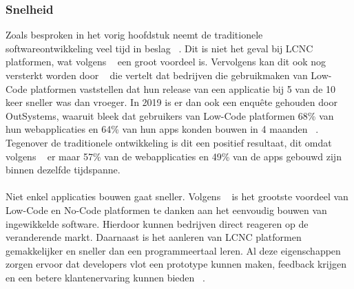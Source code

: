 \subsubsection{Snelheid}
\label{subsec:snelheid}
Zoals besproken in het vorig hoofdstuk neemt de traditionele softwareontwikkeling veel tijd in beslag ~\autocite{Moskal_2021}. 
Dit is niet het geval bij LCNC platformen, wat volgens ~\textcite{Adrian_2020} een groot voordeel is. 
Vervolgens kan dit ook nog versterkt worden door ~\textcite{Yan2021} die vertelt dat bedrijven die gebruikmaken van 
Low-Code platformen vaststellen dat hun release van een applicatie bij 5 van de 10 keer sneller was dan vroeger. In 2019 is er dan ook een enquête gehouden door OutSystems, 
waaruit bleek dat gebruikers van Low-Code platformen 68\% van hun webapplicaties en 64\% van hun apps konden bouwen in 4 maanden ~\autocite{Yan2021}. 
Tegenover de traditionele ontwikkeling is dit een positief resultaat, dit omdat volgens ~\textcite{Yan2021} er maar 57\% van de webapplicaties en 49\% van de apps gebouwd zijn binnen dezelfde tijdspanne.
\\
\\
Niet enkel applicaties bouwen gaat sneller. Volgens ~\textcite{da_Cruz_2021} is het grootste voordeel van Low-Code en No-Code platformen 
te danken aan het eenvoudig bouwen van ingewikkelde software. Hierdoor kunnen bedrijven direct reageren op de veranderende markt. 
Daarnaast is het aanleren van LCNC platformen gemakkelijker en sneller dan een programmeertaal leren. 
Al deze eigenschappen zorgen ervoor dat developers vlot een prototype kunnen maken, feedback krijgen en een betere klantenervaring kunnen bieden ~\autocite{da_Cruz_2021}.
